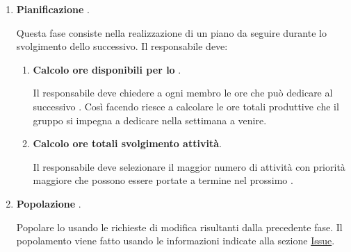 \begin{enumerate}
    \item \textbf{Pianificazione }.
    
    Questa fase consiste nella realizzazione di un piano da seguire durante lo svolgimento dello  successivo.
    Il responsabile deve:
    \begin{enumerate}
        \item \textbf{Calcolo ore disponibili per lo }.
        
        Il responsabile deve chiedere a ogni  membro le ore che può dedicare al successivo .
        Così facendo riesce a calcolare le ore totali produttive che il gruppo si impegna a dedicare nella settimana a venire.

        \item \textbf{Calcolo ore totali svolgimento attività}.
        
        Il responsabile deve selezionare il maggior numero di attività con priorità maggiore che possono essere portate a termine nel prossimo .
    \end{enumerate}

    \item \textbf{Popolazione }.
    
    Popolare lo  usando le richieste di modifica risultanti dalla precedente fase.
    Il popolamento viene fatto usando le informazioni indicate alla sezione \hyperref[subpar:ITS]{Issue}.
\end{enumerate}

